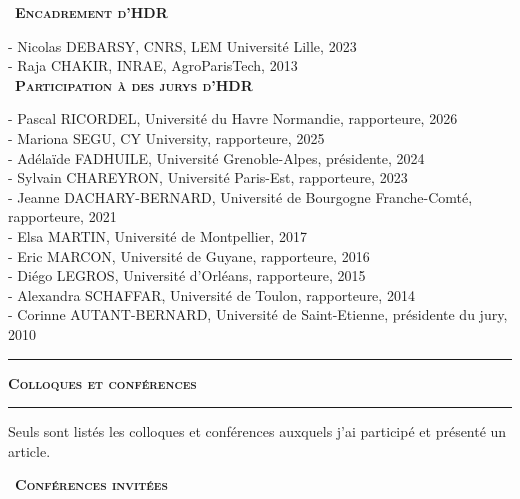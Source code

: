 \documentclass[a4paper,12pt]{article}
\newcommand{\titre}[1]{%
	\bigskip
	\noindent \rule[2mm]{\textwidth}{0.5pt}
	\textbf{\textsc{\large #1}} \\
	\noindent \rule[1mm]{\textwidth}{0.5pt}
	}
\newcommand{\smalltitre}[1]{%
	\noindent \textbullet~\textsc{\textbf{#1}}
	\smallskip
	}
\begin{document}
\smalltitre{Encadrement d'HDR} \medskip

\noindent - Nicolas DEBARSY, CNRS, LEM Université Lille, 2023 \\
\noindent - Raja CHAKIR, INRAE, AgroParisTech, 2013 \\

\smalltitre{Participation à des jurys d'HDR} \medskip

\noindent 
- Pascal RICORDEL, Université du Havre Normandie, rapporteure, 2026 \\
- Mariona SEGU, CY University, rapporteure, 2025 \\
- Adélaïde FADHUILE, Université Grenoble-Alpes, présidente, 2024 \\
- Sylvain CHAREYRON, Université Paris-Est, rapporteure, 2023 \\
- Jeanne DACHARY-BERNARD, Université de Bourgogne Franche-Comté, rapporteure, 2021 \\
- Elsa MARTIN, Université de Montpellier, 2017 \\
- Eric MARCON, Université de Guyane, rapporteure, 2016 \\
- Diégo LEGROS, Université d'Orléans, rapporteure, 2015 \\
- Alexandra SCHAFFAR, Université de Toulon, rapporteure, 2014 \\
- Corinne AUTANT-BERNARD, Université de Saint-Etienne, présidente du jury, 2010 \\


\titre{Colloques et conférences}

\noindent Seuls sont listés les colloques et conférences auxquels j'ai participé et présenté un article. \bigskip %


\smalltitre{Conférences invitées} \medskip
\end{document}
